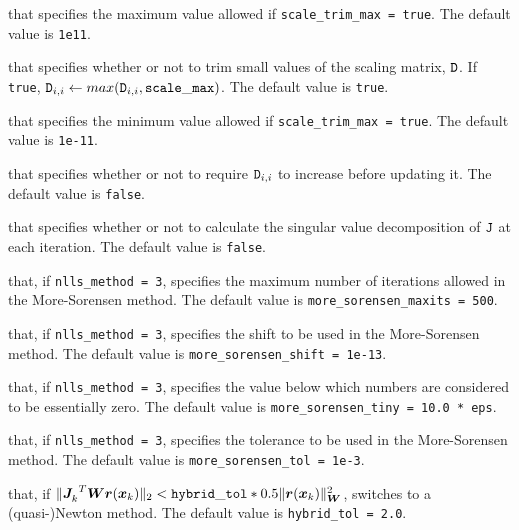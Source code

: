 \begin{description}
that specifies the maximum value allowed if {\tt scale\_trim\_max = true}.
The default value is {\tt 1e11}.

that specifies whether or not to trim small values of the scaling matrix, ${\tt D}$.
If {\tt true}, ${\tt D}_{i,i} \leftarrow max({\tt D}_{i,i}, {\tt scale\_max})$.
The default value is {\tt true}.

that specifies the minimum value allowed if {\tt scale\_trim\_max = true}.
The default value is {\tt 1e-11}.

that specifies whether or not to require ${\tt D}_{i,i}$ to increase before updating it.
The default value is {\tt false}.

that specifies whether or not to calculate the singular value decomposition of ${\tt J}$
at each iteration.
The default value is {\tt false}.



that, if {\tt nlls\_method = 3}, specifies the maximum number of iterations allowed in the More-Sorensen method.
The default value is {\tt more\_sorensen\_maxits = 500}.

that, if {\tt nlls\_method = 3}, specifies the shift to be used in the More-Sorensen method.
The default value is {\tt more\_sorensen\_shift = 1e-13}.

that, if {\tt nlls\_method = 3}, specifies the value below which numbers are considered to be essentially zero.
The default value is {\tt more\_sorensen\_tiny = 10.0 * eps}.

that, if {\tt nlls\_method = 3}, specifies the tolerance to be used in the More-Sorensen method.
The default value is {\tt more\_sorensen\_tol = 1e-3}.

that, if \(\|{{\bm J}_{k}^{}}^T {\bm W} {\bm r}({\bm x}_k) \|_2 < \mathtt{hybrid\_tol} * 0.5 \|{\bm r}({\bm x}_k)\|_{\bm W}^2\), switches to a \newline(quasi-)Newton method.
The default value is {\tt hybrid\_tol = 2.0}.


\end{description}
